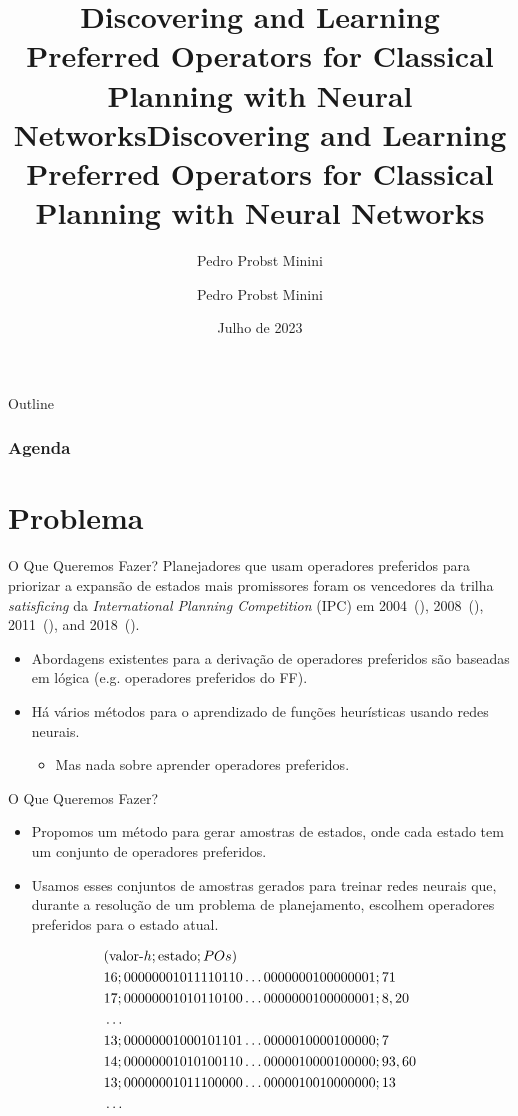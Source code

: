 \documentclass{beamer}
\title[Discovering and Learning Preferred Operators]{Discovering and Learning Preferred Operators for Classical Planning with Neural Networks}
\author{Pedro Probst Minini}
\title[Discovering and Learning Preferred Operators]
      {Discovering and Learning Preferred Operators for Classical Planning with Neural Networks}
\date{Julho de 2023}
\author{Pedro Probst Minini}
\institute{Instituto de Informática --- UFRGS}
\begin{document}

\begin{frame}[plain]
  \titlepage
\end{frame}

\begin{frame}{Outline}
  \frametitle{Agenda}
  \tableofcontents
\end{frame}

\section{Problema}
\begin{frame}{O Que Queremos Fazer?}
Planejadores que usam operadores preferidos para \alert{priorizar a expansão de estados mais promissores} foram os vencedores da trilha \emph{satisficing} da \emph{International Planning Competition} (IPC) em \alert{2004}~(\cite{Helmert/2006}), \alert{2008}~(\cite{Richter.lama.etal/2010}), \alert{2011}~(\cite{Richter.lama.etal/2011}), and \alert{2018}~(\cite{Seipp-fast.etal/2018}).

\pause
\begin{itemize}
  \item Abordagens existentes para a derivação de operadores preferidos são baseadas em lógica (e.g. operadores preferidos do FF).
  \pause
  \item Há vários métodos para o aprendizado de funções heurísticas usando redes neurais.
  \begin{itemize}
    \item Mas nada sobre aprender operadores preferidos.
  \end{itemize}
\end{itemize}
\end{frame}

\begin{frame}{O Que Queremos Fazer?}
\begin{itemize}
  \item Propomos um método para gerar amostras de estados, onde \alert{cada estado tem um conjunto de operadores preferidos}.
  \pause
  \item Usamos esses conjuntos de amostras gerados para \alert{treinar redes neurais} que, durante a resolução de um problema de planejamento, escolhem operadores preferidos para o estado atual.
\end{itemize}
\pause
\begin{align*}
\centering
&(\text{valor-}h;\text{estado};POs) \\
&16;00000001011110110\ldots0000000100000001;71 \\
&17;00000001010110100\ldots0000000100000001;8,20 \\
&\ldots \\
&13;00000001000101101\ldots0000010000100000;7 \\
&14;00000001010100110\ldots0000010000100000;93,60 \\
&13;00000001011100000\ldots0000010010000000;13 \\
&\ldots
\end{align*}
\end{frame}
\end{document}
